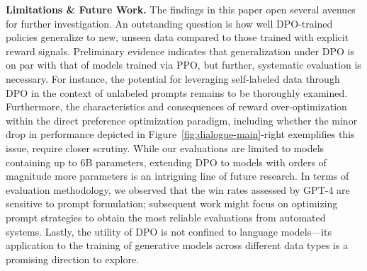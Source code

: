 \textbf{Limitations \& Future Work.} The findings in this paper open several avenues for further investigation. An outstanding question is how well DPO-trained policies generalize to new, unseen data compared to those trained with explicit reward signals. Preliminary evidence indicates that generalization under DPO is on par with that of models trained via PPO, but further, systematic evaluation is necessary. For instance, the potential for leveraging self-labeled data through DPO in the context of unlabeled prompts remains to be thoroughly examined. Furthermore, the characteristics and consequences of reward over-optimization within the direct preference optimization paradigm, including whether the minor drop in performance depicted in Figure~\ref{fig:dialogue-main}-right exemplifies this issue, require closer scrutiny. While our evaluations are limited to models containing up to 6B parameters, extending DPO to models with orders of magnitude more parameters is an intriguing line of future research. In terms of evaluation methodology, we observed that the win rates assessed by GPT-4 are sensitive to prompt formulation; subsequent work might focus on optimizing prompt strategies to obtain the most reliable evaluations from automated systems. Lastly, the utility of DPO is not confined to language models—its application to the training of generative models across different data types is a promising direction to explore.